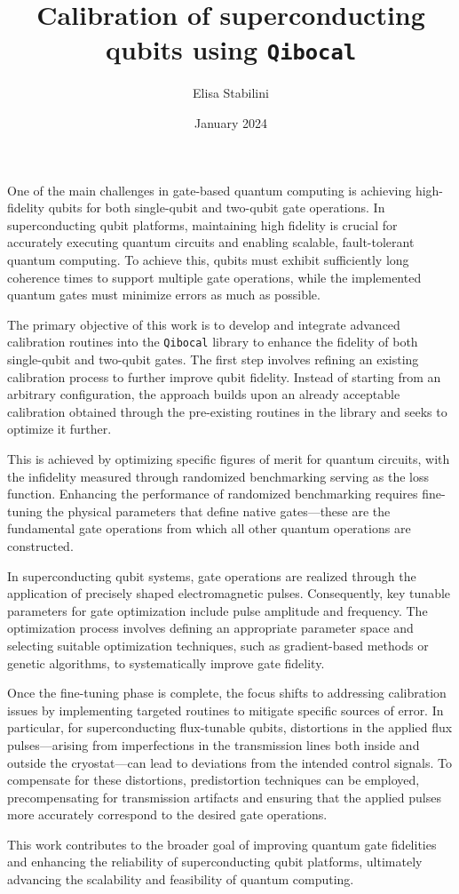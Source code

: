 \documentclass{article}
\title{Calibration of superconducting qubits using \tt{Qibocal}}
\author{Elisa Stabilini}
\date{January 2024}
\begin{document}
One of the main challenges in gate-based quantum computing is achieving high-fidelity qubits for both single-qubit and two-qubit gate operations. In superconducting qubit platforms, maintaining high fidelity is crucial for accurately executing quantum circuits and enabling scalable, fault-tolerant quantum computing. To achieve this, qubits must exhibit sufficiently long coherence times to support multiple gate operations, while the implemented quantum gates must minimize errors as much as possible.

The primary objective of this work is to develop and integrate advanced calibration routines into the \texttt{Qibocal} library to enhance the fidelity of both single-qubit and two-qubit gates. The first step involves refining an existing calibration process to further improve qubit fidelity. Instead of starting from an arbitrary configuration, the approach builds upon an already acceptable calibration obtained through the pre-existing routines in the library and seeks to optimize it further.

This is achieved by optimizing specific figures of merit for quantum circuits, with the infidelity measured through randomized benchmarking serving as the loss function. Enhancing the performance of randomized benchmarking requires fine-tuning the physical parameters that define native gates—these are the fundamental gate operations from which all other quantum operations are constructed.

In superconducting qubit systems, gate operations are realized through the application of precisely shaped electromagnetic pulses. Consequently, key tunable parameters for gate optimization include pulse amplitude and frequency. The optimization process involves defining an appropriate parameter space and selecting suitable optimization techniques, such as gradient-based methods or genetic algorithms, to systematically improve gate fidelity.

Once the fine-tuning phase is complete, the focus shifts to addressing calibration issues by implementing targeted routines to mitigate specific sources of error. In particular, for superconducting flux-tunable qubits, distortions in the applied flux pulses—arising from imperfections in the transmission lines both inside and outside the cryostat—can lead to deviations from the intended control signals. To compensate for these distortions, predistortion techniques can be employed, precompensating for transmission artifacts and ensuring that the applied pulses more accurately correspond to the desired gate operations.

This work contributes to the broader goal of improving quantum gate fidelities and enhancing the reliability of superconducting qubit platforms, ultimately advancing the scalability and feasibility of quantum computing.
\end{document}
